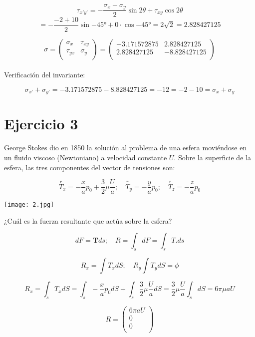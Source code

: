 \documentclass[a4paper,12pt,twoside,final,spanish]{article}
\begin{document}
\[
\tau_{x'y'}=-\frac{\sigma_{x}-\sigma_{y}}{2}\sin{2\theta}+\tau_{xy}\cos{2\theta}
\]
\[
=-\frac{-2+10}{2}\sin{-\ang{45}}+0\cdot\cos{-\ang{45}}=2\sqrt{2}=2.828427125
\]

\[
\sigma=
\left(\begin{matrix}
\sigma_{x} & \tau_{xy} \\
\tau_{yx} & \sigma_{y} \\
\end{matrix}\right)=
\left(\begin{matrix}
-3.171572875 & 2.828427125 \\
2.828427125 & -8.828427125 \\
\end{matrix}\right)
\]\\

Verificación del invariante:

\[
\sigma_{x'}+\sigma_{y'}=-3.171572875-8.828427125=-12=-2-10=\sigma_{x}+\sigma_{y}
\]

\section*{Ejercicio 3}

George Stokes dio en 1850 la solución al problema de una esfera moviéndose en un 
fluido viscoso (Newtoniano) a velocidad constante $U$. Sobre la superficie de la esfera, las tres componentes del vector de tensiones son:

\[
\stackrel r T_{x}=-\frac{x}{a}p_{0}+\frac{3}{2}\mu\frac{U}{a};\quad
\stackrel r T_{y}=-\frac{y}{a}p_{0};\quad
\stackrel r T_{z}=-\frac{z}{a}p_{0}
\]

\begin{center}
\texttt{[image: 2.jpg]}
\end{center}

¿Cuál es la fuerza resultante que actúa sobre la esfera?

\dotfill

\[
dF=\mathbf{T}ds;\quad R=\int_{s}dF=\int_{s}T.ds
\]

\[
R_{x}=\int T_{x}dS;\quad R_{y}\int T_{y}dS=\phi
\]

\[
R_{x}=\int_{s}T_{x}dS=\int_{s}-\frac{x}{a}p_{0}dS+\int_{s}\frac{3}{2}\mu\frac{U}{a}dS
=\frac{3}{2}\mu\frac{U}{a}\int_{s}dS=6\pi\mu aU
\]

\[
R=
\left(\begin{matrix}
6\pi aU \\
0 \\
0 \\
\end{matrix}\right)
\]
\end{document}
